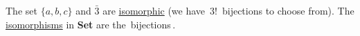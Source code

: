 The set $\{a,b,c\}$ and $\bar{3}$ are \hyperref[D3.28]{isomorphic} (we have \,$3!$\, bijections to choose from). The \hyperref[D3.28]{isomorphisms} in \textbf{Set} are the \,bijections\,.

